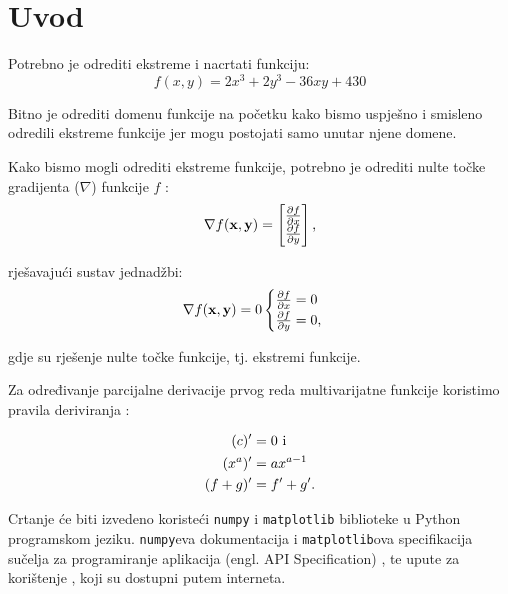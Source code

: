 \chapter{Uvod}

Potrebno je odrediti ekstreme i nacrtati funkciju:
\begin{equation}
f(x, y) = 2x^3 + 2y^3 - 36xy + 430
\end{equation}

Bitno je odrediti domenu funkcije na početku kako bismo uspješno i smisleno odredili ekstreme funkcije jer mogu postojati samo unutar njene domene.

Kako bismo mogli odrediti ekstreme funkcije, potrebno je odrediti nulte točke gradijenta ($\nabla$) funkcije $f$ \cite{ccalc}:
\begin{equation}
    \nabla f(\mathbf{x}, \mathbf{y}) = \begin{bmatrix}
        \frac{\partial f}{\partial x} \\
        \frac{\partial f}{\partial y}
    \end{bmatrix}\textnormal{,}
\end{equation}

rješavajući sustav jednadžbi:
\begin{equation}
    \nabla f(\mathbf{x}, \mathbf{y}) = 0\\
    \begin{cases}
        \frac{\partial f}{\partial x} = 0 \\
        \frac{\partial f}{\partial y} = 0 \textnormal{,}
    \end{cases}
\end{equation}

gdje su rješenje nulte točke funkcije, tj. ekstremi funkcije.

Za određivanje parcijalne derivacije prvog reda multivarijatne funkcije koristimo pravila deriviranja \cite{kolegij}:

\begin{align}
    (c)' &= 0 \text{ i }\\
    (x^a)' &= ax^{a-1}\\
    (f + g)' &= f' + g' \textnormal{.}
\end{align}

\vspace*{20pt}

Crtanje će biti izvedeno koristeći \verb|numpy| i \verb|matplotlib| biblioteke u Python programskom jeziku.
\verb|numpy|eva dokumentacija\cite{numpy_doc} i \verb|matplotlib|ova specifikacija sučelja za programiranje aplikacija (engl. API Specification) \cite{mpl_api}, te upute za korištenje \cite{mpl_ug}, koji su dostupni putem interneta.

\newpage
